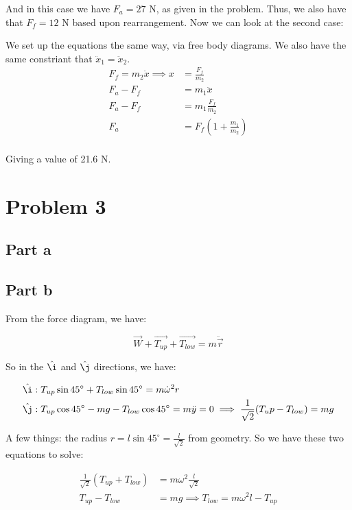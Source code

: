 \documentclass{article}
\theoremstyle{definition}
\numberwithin{equation}{section}
\numberwithin{definition}{section}
\begin{document}
	And in this case we have $F_a = 27$ N, as given in the problem. Thus, we also have that $F_f = 12$ N based upon rearrangement. Now we can look at the second case:
	
	
	
	We set up the equations the same way, via free body diagrams. We also have the same constriant that $\ddot x_1 = \ddot x_2$. 
	\begin{align*}
		F_f = m_2\ddot x \implies x &= \frac{F_f}{m_2}\\
		F_a - F_f &= m_1 \ddot x\\
		F_a - F_f &= m_1\frac{F_f}{m_2}\\
		F_a &= F_f\left(1 + \frac{m_1}{m_2}\right)\\
	\end{align*}

	Giving a value of 21.6 N.
	
	\section{Problem 3}
	\subsection{Part a}
	
	
	\subsection{Part b}
	
	From the force diagram, we have:
	
	\[\vec{W} + \vec{T_{up}} + \vec{T_{low}} = m \ddot{\vec{r}}\]
	
	So in the $\hat \i$ and $\hat \j$ directions, we have:
	
	\begin{align*}
		\hat \i &: T_{up} \sin 45^\circ + T_{low}\sin 45^\circ = m \dot \omega^2 r\\
		\hat \j &: T_{up} \cos 45^\circ - mg - T_{low}\cos 45^\circ = m\ddot y = 0 \implies \frac{1}{\sqrt{2}}(T_up - T_{low}) = mg
	\end{align*}

	A few things: the radius $r = l\sin45^\circ = \frac{l}{\sqrt{2}}$ from geometry. So we have these two equations to solve:
	
	\begin{align*}
		\frac{1}{\sqrt{2}} (T_{up} + T_{low}) &= m\omega^2 \frac{l}{\sqrt{2}}\\
		T_{up} - T_{low} &= mg \implies T_{low} = m \omega^2 l - T_{up}\\
	\end{align*}
\end{document}
